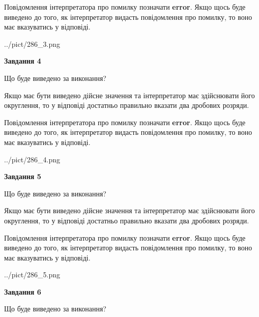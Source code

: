 \documentclass[12pt, ukrainian]{article}
\begin{document}
{\begin {Large}
Повідомлення інтерпретатора про помилку позначати \textbf{error}.
Якщо щось буде виведено до того, як інтерпретатор видасть повідомлення про помилку, 
то воно має вказуватись у відповіді. \par

\begin{center}
	{../pict/286_3.png}
\end{center}
\newpage

{\begin {center}\textbf{Завдання 4}\end {center}}\par
Що буде виведено за виконання? \par

Якщо має бути виведено дійсне значення та інтерпретатор має здійснювати його округлення, 
то у відповіді достатньо правильно вказати два дробових розряди.

Повідомлення інтерпретатора про помилку позначати \textbf{error}.
Якщо щось буде виведено до того, як інтерпретатор видасть повідомлення про помилку, 
то воно має вказуватись у відповіді. \par

\begin{center}
	{../pict/286_4.png}
\end{center}
\newpage

{\begin {center}\textbf{Завдання 5}\end {center}}\par
Що буде виведено за виконання? \par

Якщо має бути виведено дійсне значення та інтерпретатор має здійснювати його округлення, 
то у відповіді достатньо правильно вказати два дробових розряди.

Повідомлення інтерпретатора про помилку позначати \textbf{error}.
Якщо щось буде виведено до того, як інтерпретатор видасть повідомлення про помилку, 
то воно має вказуватись у відповіді. \par

\begin{center}
	{../pict/286_5.png}
\end{center}
\newpage

{\begin {center}\textbf{Завдання 6}\end {center}}\par
Що буде виведено за виконання? \par


\end{Large}}
\end{document}
